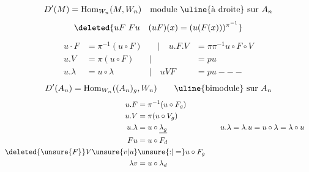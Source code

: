 \[
D'(M)=\operatorname{Hom}_{W_n}(M,W_n)\quad\text{module \uline{à droite} sur }A_n
\]
\[
\deleted{uF\ Fu\quad(uF)(x)=(u(F(x)))^{\pi^{-1}}}
\]
\[
\begin{aligned}
u\cdot F&=\pi^{-1}(u\circ F)&\quad\big| \quad u.F.V&=\pi\pi^{-1}u\circ F\circ V\\
u.V&=\pi(u\circ F)&\big|&=pu\\
u.\lambda&=u\circ\lambda&\big|\quad uVF&=pu\ \mathord{---}
\end{aligned}
\]
\[
D'(A_n)=\operatorname{Hom}_{W_n}((A_n)_g,W_n)\qquad\text{\uline{bimodule} sur }A_n
\]
\[
\begin{aligned}
u.F&=\pi^{-1}(u\circ F_g)\\
u.V&=\pi(u\circ V_g)\\
u.\lambda&=u\circ\underline{\lambda_g}&\quad u.\lambda&=\lambda.u=u\circ\lambda=\lambda\circ u\\
Fu&=u\circ F_d\\
\deleted{\unsure{F}}V\unsure{v|u}&\unsure{{:}|=}u\circ F_g\\
\lambda v&=u\circ\lambda_d
\end{aligned}
\]


